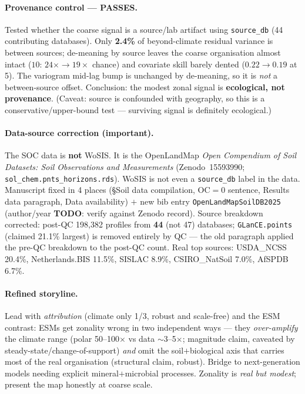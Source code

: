 \documentclass[11pt,a4paper]{article}
\begin{document}
\paragraph{Provenance control --- PASSES.} Tested whether the coarse signal is a
source/lab artifact using \texttt{source\_db} (44 contributing databases). Only
\textbf{2.4\%} of beyond-climate residual variance is between sources; de-meaning by
source leaves the coarse organisation almost intact ($10$\textdegree: $24\times\to19\times$
chance) and covariate skill barely dented ($0.22\to0.19$ at 5\textdegree). The
variogram mid-lag bump is unchanged by de-meaning, so it is \emph{not} a between-source
offset. Conclusion: the modest zonal signal is \textbf{ecological, not provenance}.
(Caveat: source is confounded with geography, so this is a conservative/upper-bound
test --- surviving signal is definitely ecological.)

\paragraph{Data-source correction (important).} The SOC data is \textbf{not} WoSIS.
It is the OpenLandMap \emph{Open Compendium of Soil Datasets: Soil Observations and
Measurements} (Zenodo~15593990; \texttt{sol\_chem.pnts\_horizons.rds}). WoSIS is not
even a \texttt{source\_db} label in the data. Manuscript fixed in 4 places
(\S Soil data compilation, OC$=$0 sentence, Results data paragraph, Data
availability) $+$ new bib entry \texttt{OpenLandMapSoilDB2025} (author/year
\textbf{TODO}: verify against Zenodo record). Source breakdown corrected: post-QC
198{,}382 profiles from \textbf{44} (not 47) databases; \texttt{GLanCE.points}
(claimed 21.1\% largest) is removed entirely by QC --- the old paragraph applied the
pre-QC breakdown to the post-QC count. Real top sources: USDA\_NCSS 20.4\%,
Netherlands.BIS 11.5\%, SISLAC 8.9\%, CSIRO\_NatSoil 7.0\%, AfSPDB 6.7\%.

\paragraph{Refined storyline.} Lead with \emph{attribution} (climate only 1/3,
robust and scale-free) and the ESM contrast: ESMs get zonality wrong in two
independent ways --- they \emph{over-amplify} the climate range (polar 50--100$\times$
vs data $\sim$3--5$\times$; magnitude claim, caveated by steady-state/change-of-support)
\emph{and} omit the soil$+$biological axis that carries most of the real organisation
(structural claim, robust). Bridge to next-generation models needing explicit
mineral$+$microbial processes. Zonality is \emph{real but modest}; present the map
honestly at coarse scale.
\end{document}
